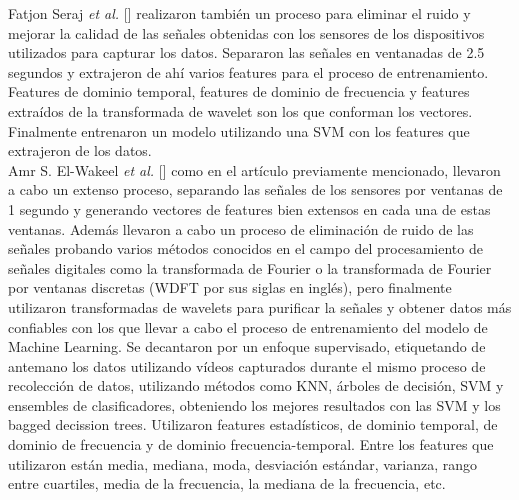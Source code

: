 Fatjon Seraj {\it et al.} []  realizaron también un proceso para eliminar el ruido y mejorar la calidad de las señales 
obtenidas con los sensores de los dispositivos utilizados para capturar los datos. Separaron las señales en ventanadas de 2.5 segundos y extrajeron de ahí varios 
features para el proceso de entrenamiento. Features de dominio temporal, features de dominio de frecuencia y features extraídos de la transformada de wavelet son 
los que conforman los vectores. Finalmente entrenaron un modelo utilizando una SVM con los features que extrajeron de los datos.\\

Amr S. El-Wakeel {\it et al.} [] como en el artículo previamente mencionado, llevaron a cabo un extenso proceso, separando las señales de los sensores por
ventanas de 1 segundo y generando vectores de features bien extensos en cada una de estas ventanas. Además llevaron a cabo un proceso de eliminación de ruido
de las señales probando varios métodos conocidos en el campo del procesamiento de señales digitales como la transformada de Fourier o la transformada de
Fourier por ventanas discretas (WDFT por sus siglas en inglés), pero finalmente utilizaron transformadas de wavelets para purificar la señales y obtener
datos más confiables con los que llevar a cabo el proceso de entrenamiento del modelo de Machine Learning. Se decantaron por un enfoque supervisado, etiquetando
de antemano los datos utilizando vídeos capturados durante el mismo proceso de recolección de datos, utilizando métodos como KNN, árboles de decisión, SVM y
ensembles de clasificadores, obteniendo los mejores resultados con las SVM y los bagged decission trees. Utilizaron features estadísticos, de dominio temporal,
de dominio de frecuencia y de dominio frecuencia-temporal. Entre los features que utilizaron están media, mediana, moda, desviación estándar, varianza, rango
entre cuartiles, media de la frecuencia, la mediana de la frecuencia, etc.\\


